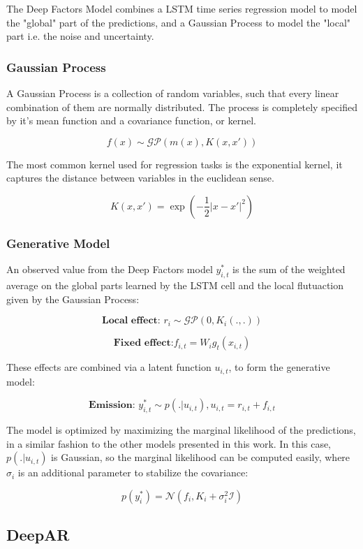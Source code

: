 \documentclass[a4paper]{article}
\begin{document}
The Deep Factors Model combines a LSTM time series regression model to model the "global" part of the predictions, and a Gaussian Process to model the "local" part
i.e. the noise and uncertainty. 

\subsubsection{Gaussian Process}
\label{sec:org41b8df1}
A Gaussian Process \cite{gpml} is a collection of random variables, such that every linear combination of them are normally distributed. The process is completely specified by it's
mean function and a covariance function, or kernel. 

\[
f(x) \sim \mathcal{GP}( m(x), K(x,x'))
\]

The most common kernel used for regression tasks is the exponential kernel, it captures the distance between variables in 
the euclidean sense.

\[
  K(x,x') = \exp(-\frac{1}{2}|x - x'|^2)
\]

\subsubsection{Generative Model}
\label{sec:orgaa53833}
An observed value from the Deep Factors model \(y^*_{i,t}\) is the sum of the weighted average on the global parts learned by the LSTM cell and the local flutuaction
given by the Gaussian Process:

\[
  \textbf{Local effect: }  r_i \sim \mathcal{GP} (0, K_i(.,.))
\]

\[
  \textbf{Fixed effect:}  f_{i,t} = W_ig_t(x_{i,t})
\]

These effects are combined via a latent function \(u_{i,t}\), to form the generative model: 

\[
  \textbf{Emission: }  y^*_{i,t} \sim p(. | u_{i,t}) , u_{i,t} = r_{i,t} + f_{i,t}  
\]

The model is optimized by maximizing the marginal likelihood of the predictions, in a similar fashion to the other models presented in this work. 
In this case, \(p(.|u_{i,t})\) is Gaussian, so the marginal likelihood can be computed easily, where \(\sigma_i\) is an additional parameter to stabilize the covariance:

\[
p(y^*_{i}) = \mathcal{N}(f_i,K_i + \sigma_i^2\mathcal{I})
\]

\subsection{DeepAR \cite{deepar}}
\label{sec:org5bcf060}
\end{document}
